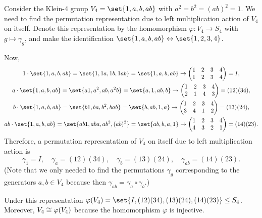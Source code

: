 \documentclass[11pt]{penrose}
\begin{document}
\begin{negg}
    Consider the Klein-4 group $V_{4} = \set{1,a,b,ab}$ with $a^{2} = b^{2} = (ab)^{2} = 1$. We need to find the permutation representation due to left multiplication action of $V_{4}$ on itself. Denote this representation by the homomorphism $\varphi : V_{4} \to S_{4}$ with $g \mapsto \gamma_{g}$, and make the identification $\set{1,a,b,ab} \leftrightarrow \set{1,2,3,4}$.

    Now,
    \begin{gather*}
        1 \cdot \set{1, a, b, ab}
        = \set{1, 1a, 1b, 1ab}
        = \set{1, a, b, ab}
        \to
        \begin{pmatrix*}
            1 & 2 & 3 & 4\\
            1 & 2 & 3 & 4\\
        \end{pmatrix*}
        = I,\\
        a \cdot \set{1, a, b, ab}
        = \set{a1, a^{2}, ab, a^{2}b}
        = \set{a, 1, ab, b}
        \to
        \begin{pmatrix*}
            1 & 2 & 3 & 4\\
            2 & 1 & 4 & 3\\
        \end{pmatrix*}
        = (1 2)(3 4),\\
        b \cdot \set{1, a, b, ab}
        = \set{b1, ba, b^{2}, bab}
        = \set{b, ab, 1, a}
        \to
        \begin{pmatrix*}
            1 & 2 & 3 & 4\\
            3 & 4 & 1 & 2\\
        \end{pmatrix*}
        = (1 3)(2 4),\\
        ab \cdot \set{1, a, b, ab}
        = \set{ab1, aba, ab^{2}, (ab)^{2}}
        = \set{ab, b, a, 1}
        \to
        \begin{pmatrix*}
            1 & 2 & 3 & 4\\
            4 & 3 & 2 & 1\\
        \end{pmatrix*}
        = (1 4)(2 3).
    \end{gather*}
    Therefore, a permutation representation of $V_{4}$ on itself due to left multiplication action is
    \begin{equation*}
        \gamma_{1} = I, \quad
        \gamma_{a} = (1 2)(3 4), \quad
        \gamma_{b} = (1 3)(2 4), \quad
        \gamma_{ab} = (1 4)(2 3).
    \end{equation*}
    (Note that we only needed to find the permutations $\gamma_{g}$ corresponding to the generators $a, b \in V_{4}$ because then $\gamma_{ab} = \gamma_{a} \circ \gamma_{b}$.)

    Under this representation $\varphi(V_{4}) = \set{ I, (1 2)(3 4), (1 3)(2 4), (1 4)(2 3) } \subgroup S_{4}$. Moreover, $V_{4} \mathrel{\cong} \varphi(V_{4})$ because the homomorphism $\varphi$ is injective.
\end{negg}
\end{document}
